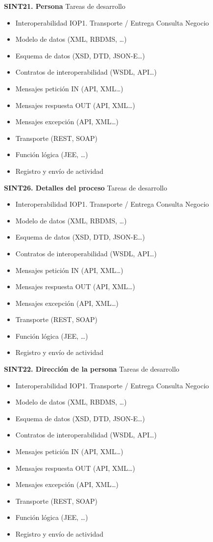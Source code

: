 \documentclass[
  paper=a4,
  ,captions=tableheading
]{scrartcl}
\providecommand{\tightlist}{%
  \setlength{\itemsep}{0pt}\setlength{\parskip}{0pt}}
\begin{document}
\textbf{SINT21. Persona} Tareas de desarrollo

\begin{itemize}
\tightlist
\item
  Interoperabilidad IOP1. Transporte / Entrega Consulta Negocio
\item
  Modelo de datos (XML, RBDMS, \ldots)
\item
  Esquema de datos (XSD, DTD, JSON-E\ldots)
\item
  Contratos de interoperabilidad (WSDL, API\ldots)
\item
  Mensajes petición IN (API, XML\ldots)
\item
  Mensajes respuesta OUT (API, XML\ldots)
\item
  Mensajes excepción (API, XML\ldots)
\item
  Transporte (REST, SOAP)
\item
  Función lógica (JEE, \ldots)
\item
  Registro y envío de actividad
\end{itemize}

\textbf{SINT26. Detalles del proceso} Tareas de desarrollo

\begin{itemize}
\tightlist
\item
  Interoperabilidad IOP1. Transporte / Entrega Consulta Negocio
\item
  Modelo de datos (XML, RBDMS, \ldots)
\item
  Esquema de datos (XSD, DTD, JSON-E\ldots)
\item
  Contratos de interoperabilidad (WSDL, API\ldots)
\item
  Mensajes petición IN (API, XML\ldots)
\item
  Mensajes respuesta OUT (API, XML\ldots)
\item
  Mensajes excepción (API, XML\ldots)
\item
  Transporte (REST, SOAP)
\item
  Función lógica (JEE, \ldots)
\item
  Registro y envío de actividad
\end{itemize}

\textbf{SINT22. Dirección de la persona} Tareas de desarrollo

\begin{itemize}
\tightlist
\item
  Interoperabilidad IOP1. Transporte / Entrega Consulta Negocio
\item
  Modelo de datos (XML, RBDMS, \ldots)
\item
  Esquema de datos (XSD, DTD, JSON-E\ldots)
\item
  Contratos de interoperabilidad (WSDL, API\ldots)
\item
  Mensajes petición IN (API, XML\ldots)
\item
  Mensajes respuesta OUT (API, XML\ldots)
\item
  Mensajes excepción (API, XML\ldots)
\item
  Transporte (REST, SOAP)
\item
  Función lógica (JEE, \ldots)
\item
  Registro y envío de actividad
\end{itemize}
\end{document}
